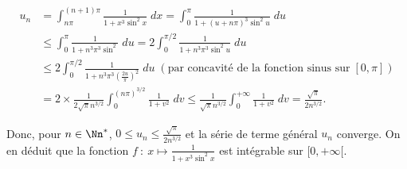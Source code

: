 {\begin{enumerate}
{\begin{align*}
u_n&=\int_{n\pi}^{(n+1)\pi}\frac{1}{1+x^3\sin^2x}\;dx=\int_{0}^{\pi}\frac{1}{1+(u+n\pi)^3\sin^2u}\;du\\

 &\leqslant\int_{0}^{\pi}\frac{1}{1+n^3\pi^3\sin^2}\;du = 2\int_{0}^{\pi/2}\frac{1}{1+n^3\pi^3\sin^2u}\;du\\

 &\leqslant2\int_{0}^{\pi/2}\frac{1}{1+n^3\pi^3\left(\frac{2u}{\pi}\right)^2}\;du\;(\text{par concavité de la fonction sinus sur}\;[0,\pi])\\

 &= 2\times\frac{1}{2\sqrt{\pi}n^{3/2}}\int_{0}^{(n\pi)^{3/2}}\frac{1}{1+v^2}\;dv\leqslant\frac{1}{\sqrt{\pi}n^{3/2}}\int_{0}^{+\infty}\frac{1}{1+v^2}\;dv =\frac{\sqrt{\pi}}{2n^{3/2}}.

\end{align*}



	

Donc, pour $n\in\Nn^*$, $0\leqslant u_n\leqslant\frac{\sqrt{\pi}}{2n^{3/2}}$ et la série de terme général $u_n$ converge. On en déduit que la fonction $f~:~x\mapsto\frac{1}{1+x^3\sin^2x}$ est intégrable sur $[0,+\infty[$.}
\end{enumerate}
}
